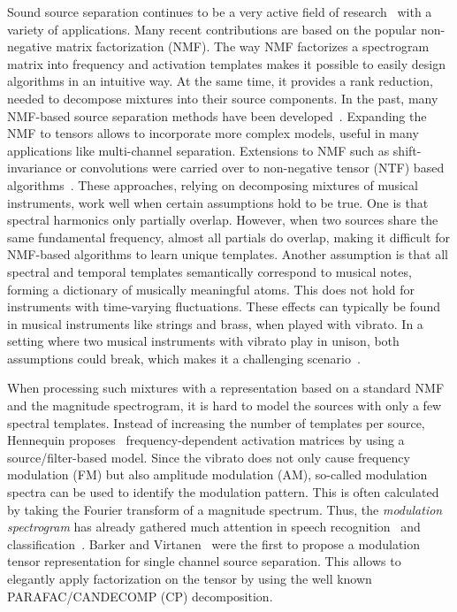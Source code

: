 Sound source separation continues to be a very active field of research~\cite{vincent14} with a variety of applications. Many recent contributions are based on the popular non-negative matrix factorization (NMF). The way NMF factorizes a spectrogram matrix into frequency and activation templates makes it possible to easily design algorithms in an intuitive way. At the same time, it provides a rank reduction, needed to decompose mixtures into their source components.
In the past, many NMF-based source separation methods have been developed~\cite{smaragdis03, smaragdis04, virtanen07}. Expanding the NMF to tensors allows to incorporate more complex models, useful in many applications like multi-channel separation. Extensions to NMF such as shift-invariance or convolutions were carried over to non-negative tensor (NTF) based algorithms~\cite{fitzgerald05, fitzgerald08, fitzgerald06, fevotte10, ozerov11}. These approaches, relying on decomposing mixtures of musical instruments, work well when certain assumptions hold to be true.
One is that spectral harmonics only partially overlap. However, when two sources share the same fundamental frequency, almost all partials do overlap, making it difficult for NMF-based algorithms to learn unique templates. Another assumption is that all spectral and temporal templates semantically correspond to musical notes, forming a dictionary of musically meaningful atoms.
This does not hold for instruments with time-varying fluctuations. These effects can typically be found in musical instruments like strings and brass, when played with vibrato. In a setting where two musical instruments with vibrato play in unison, both assumptions could break, which makes it a challenging scenario~\cite{stoeter14}.

When processing such mixtures with a representation based on a standard NMF and the magnitude spectrogram, it is hard to model the sources with only a few spectral templates. Instead of increasing the number of templates per source, Hennequin proposes~\cite{hennequin11} frequency-dependent activation matrices by using a source/filter-based model.
Since the vibrato does not only cause frequency modulation (FM) but also amplitude modulation (AM), so-called modulation spectra can be used to identify the modulation pattern. This is often calculated by taking the Fourier transform of a magnitude spectrum. Thus, the \emph{modulation spectrogram} has already gathered much attention in speech recognition~\cite{greenberg97,kingsbury98} and classification~\cite{kinnunen08, markaki09}.
Barker and Virtanen~\cite{barker13} were the first to propose a modulation tensor representation for single channel source separation. This allows to elegantly apply factorization on the tensor by using the well known PARAFAC/CANDECOMP (CP) decomposition.

